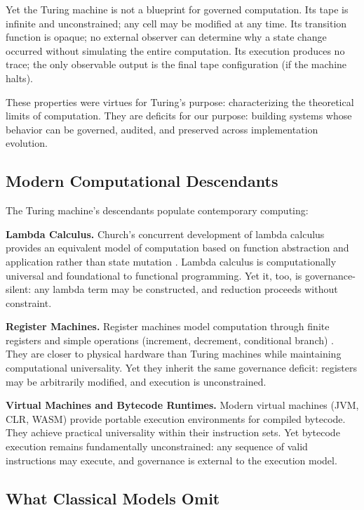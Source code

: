 \documentclass[11pt,a4paper]{article}
\begin{document}
Yet the Turing machine is not a blueprint for governed computation. Its tape is infinite and unconstrained; any cell may be modified at any time. Its transition function is opaque; no external observer can determine why a state change occurred without simulating the entire computation. Its execution produces no trace; the only observable output is the final tape configuration (if the machine halts).

These properties were virtues for Turing's purpose: characterizing the theoretical limits of computation. They are deficits for our purpose: building systems whose behavior can be governed, audited, and preserved across implementation evolution.

\subsection{Modern Computational Descendants}

The Turing machine's descendants populate contemporary computing:

\textbf{Lambda Calculus.} Church's concurrent development of lambda calculus provides an equivalent model of computation based on function abstraction and application rather than state mutation \citep{church1936unsolvable,barendregt1984lambda}. Lambda calculus is computationally universal and foundational to functional programming. Yet it, too, is governance-silent: any lambda term may be constructed, and reduction proceeds without constraint.

\textbf{Register Machines.} Register machines model computation through finite registers and simple operations (increment, decrement, conditional branch) \citep{minsky1967computation,shepherdson1963computability}. They are closer to physical hardware than Turing machines while maintaining computational universality. Yet they inherit the same governance deficit: registers may be arbitrarily modified, and execution is unconstrained.

\textbf{Virtual Machines and Bytecode Runtimes.} Modern virtual machines (JVM, CLR, WASM) provide portable execution environments for compiled bytecode. They achieve practical universality within their instruction sets. Yet bytecode execution remains fundamentally unconstrained: any sequence of valid instructions may execute, and governance is external to the execution model.

\subsection{What Classical Models Omit}
\end{document}
